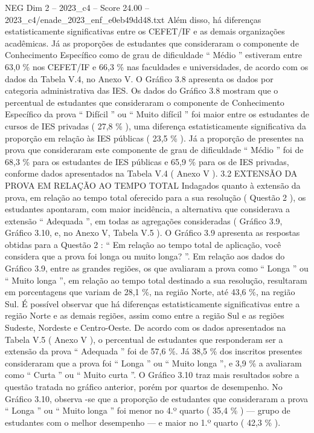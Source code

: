 \begin{textsample}{NEG Dim 2 – 2023\_c4 – Score 24.00 – 2023\_c4/enade\_2023\_enf\_e0eb49dd48.txt}
Além disso, há diferenças estatisticamente significativas entre os CEFET/IF e as demais organizações acadêmicas.
Já as proporções de estudantes que consideraram o componente de Conhecimento Específico como de grau de dificuldade “ Médio ” estiveram entre 63,0 \% nos CEFET/IF e 66,3 \% nas faculdades e universidades, de acordo com os dados da Tabela V.4, no Anexo V.
O Gráfico 3.8 apresenta os dados por categoria administrativa das IES.
Os dados do Gráfico 3.8 mostram que o percentual de estudantes que consideraram o componente de Conhecimento Específico da prova “ Difícil ” ou “ Muito difícil ” foi maior entre os estudantes de cursos de IES privadas ( 27,8 \% ), uma diferença estatisticamente significativa da proporção em relação às IES públicas ( 23,5 \% ).
Já a proporção de presentes na prova que consideraram este componente de grau de dificuldade “ Médio ” foi de 68,3 \% para os estudantes de IES públicas e 65,9 \% para os de IES privadas, conforme dados apresentados na Tabela V.4 ( Anexo V ). 3.2 EXTENSÃO DA PROVA EM RELAÇÃO AO TEMPO TOTAL Indagados quanto à extensão da prova, em relação ao tempo total oferecido para a sua resolução ( Questão 2 ), os estudantes apontaram, com maior incidência, a alternativa que considerava a extensão “ Adequada ”, em todas as agregações consideradas ( Gráfico 3.9, Gráfico 3.10, e, no Anexo V, Tabela V.5 ).
O Gráfico 3.9 apresenta as respostas obtidas para a Questão 2 : “ Em relação ao tempo total de aplicação, você considera que a prova foi longa ou muito longa? ”.
Em relação aos dados do Gráfico 3.9, entre as grandes regiões, os que avaliaram a prova como “ Longa ” ou “ Muito longa ”, em relação ao tempo total destinado a sua resolução, resultaram em porcentagens que variam de 28,1 \%, na região Norte, até 43,6 \%, na região Sul.
É possível observar que há diferenças estatisticamente significativas entre a região Norte e as demais regiões, assim como entre a região Sul e as regiões Sudeste, Nordeste e Centro-Oeste.
De acordo com os dados apresentados na Tabela V.5 ( Anexo V ), o percentual de estudantes que responderam ser a extensão da prova “ Adequada ” foi de 57,6 \%.
Já 38,5 \% dos inscritos presentes consideraram que a prova foi “ Longa ” ou “ Muito longa ”, e 3,9 \% a avaliaram como “ Curta ” ou “ Muito curta ”.
O Gráfico 3.10 traz mais resultados sobre a questão tratada no gráfico anterior, porém por quartos de desempenho.
No Gráfico 3.10, observa -se que a proporção de estudantes que consideraram a prova “ Longa ” ou “ Muito longa ” foi menor no 4.º quarto ( 35,4 \% ) — grupo de estudantes com o melhor desempenho — e maior no 1.º quarto ( 42,3 \% ).

\end{textsample}
